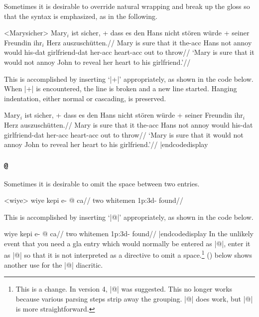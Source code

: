 %
Sometimes it is desirable to override natural wrapping and
break up the gloss so that the syntax is emphasized, as in the
following.

\framedisplay
\ex<Marysicher>
\begingl
\gla Mary$_i$ ist sicher, + dass es den Hans nicht st\"oren w\"urde
+ seiner Freundin ihr$_i$ Herz auszusch\"utten.//
\glb Mary is sure that it the-{\sc acc} Hans not annoy would
his-{\sc dat} girlfriend-{\sc dat} her-{\sc acc} heart-{\sc acc} {out to
throw}//
\glft  `Mary is sure that it would not annoy John to reveal her
heart to his girlfriend.'//
\endgl
\xe
\endframedisplay

\bigskip
This is accomplished by inserting `|+|' appropriately, as shown in the
code below.  When |+| is encountered, the line is broken and a new
line started.  Hanging indentation, either normal or cascading, is
preserved.

\codedisplay
\ex
\begingl
\gla Mary$_i$ ist sicher, + dass es den Hans nicht st\"oren w\"urde
+ seiner Freundin ihr$_i$ Herz auszusch\"utten.//
\glb Mary is sure that it the-{\sc acc} Hans not annoy would
his-{\sc dat} girlfriend-{\sc dat} her-{\sc acc} heart-{\sc acc} {out to
throw}//
\glft  `Mary is sure that it would not annoy John to reveal her
heart to his girlfriend.'//
\endgl
\xe
|endcodedisplay

\subsubsection {\tt @}

%
Sometimes it is desirable to omit the space between two entries.

\framedisplay
\ex<wiye>
\begingl
\gla wiye kepi e- @ ca//
\glb two whitemen {\sc 1p:3d}- found//
\endgl
\xe
\endframedisplay

This is accomplished by inserting `|@|' appropriately, as shown
in the code below.

\codedisplay
\ex
\begingl
\gla wiye kepi e- @ ca//
\glb two whitemen {\sc 1p:3d}- found//
\endgl
\xe
|endcodedisplay
In the unlikely event that you need a gla entry which
would normally be entered as |@|, enter it as |{\relax @}|
so that it is not interpreted as a directive to omit a
space.\footnote{This is a change.  In version 4, |{{@}}| was
suggested.  This no longer works because various parsing steps strip
away the grouping.  |{{{{@}}}}| does work, but |{\relax @}| is more straightforward.}
() below shows another use for the |@| diacritic.

